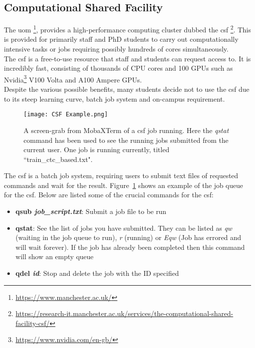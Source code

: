 \subsection{Computational Shared Facility}
The \acrfull{uom} \footnote{\url{https://www.manchester.ac.uk/}}, provides a high-performance computing cluster dubbed the \acrfull{csf} \footnote{\url{https://research-it.manchester.ac.uk/services/the-computational-shared-facility-csf/}}. This is provided for primarily staff and PhD students to carry out computationally intensive tasks or jobs requiring possibly hundreds of cores simultaneously.\\
The \acrshort{csf} is a free-to-use resource that staff and students can request access to. It is incredibly fast, consisting of thousands of CPU cores and 100 GPUs such as Nvidia\footnote{\url{https://www.nvidia.com/en-gb/}} V100 Volta and A100 Ampere GPUs.\\
Despite the various possible benefits, many students decide not to use the \acrshort{csf} due to its steep learning curve, batch job system and on-campus requirement.\\
\begin{figure}
\centering
\texttt{[image: CSF Example.png]}
\caption[A screen-grab from MobaXTerm of a \acrshort{csf} job running.]{A screen-grab from MobaXTerm of a \acrshort{csf} job running. Here the \textit{qstat} command has been used to see the running jobs submitted from the current user. One job is running currently, titled ``train\_ctc\_based.txt".}
\label{fig:CSF Example}
\end{figure}
The \acrshort{csf} is a batch job system, requiring users to submit text files of requested commands and wait for the result. Figure~\ref{fig:CSF Example} shows an example of the job queue for the \acrshort{csf}. Below are listed some of the crucial commands for the \acrshort{csf}:
\begin{itemize}
  \item \textbf{qsub \textit{job\_script.txt}}: Submit a job file to be run
  \item \textbf{qstat}: See the list of jobs you have submitted. They can be listed as \textit{qw} (waiting in the job queue to run), \textit{r} (running) or \textit{Eqw} (Job has errored and will wait forever). If the job has already been completed then this command will show an empty queue
  \item \textbf{qdel \textit{id}}: Stop and delete the job with the ID specified
\end{itemize}
